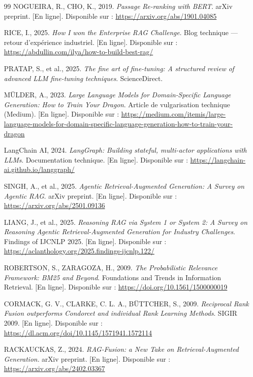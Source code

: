 \begin{thebibliography}{99}
NOGUEIRA, R., CHO, K., 2019. 
\textit{Passage Re-ranking with BERT}. 
arXiv preprint. 
[En ligne]. Disponible sur : \url{https://arxiv.org/abs/1901.04085}

RICE, I., 2025. 
\textit{How I won the Enterprise RAG Challenge}. 
Blog technique — retour d’expérience industriel. 
[En ligne]. Disponible sur : \url{https://abdullin.com/ilya/how-to-build-best-rag/}

PRATAP, S., et al., 2025. 
\textit{The fine art of fine-tuning: A structured review of advanced LLM fine-tuning techniques}. 
ScienceDirect.

MÜLDER, A., 2023. 
\textit{Large Language Models for Domain-Specific Language Generation: How to Train Your Dragon}. 
Article de vulgarisation technique (Medium). 
[En ligne]. Disponible sur : \url{https://medium.com/itemis/large-language-models-for-domain-specific-language-generation-how-to-train-your-dragon}


LangChain AI, 2024. 
\textit{LangGraph: Building stateful, multi-actor applications with LLMs}. 
Documentation technique. 
[En ligne]. Disponible sur : \url{https://langchain-ai.github.io/langgraph/}

SINGH, A., et al., 2025. 
\textit{Agentic Retrieval-Augmented Generation: A Survey on Agentic RAG}. 
arXiv preprint. 
[En ligne]. Disponible sur : \url{https://arxiv.org/abs/2501.09136}

LIANG, J., et al., 2025. 
\textit{Reasoning RAG via System 1 or System 2: A Survey on Reasoning Agentic Retrieval-Augmented Generation for Industry Challenges}. 
Findings of IJCNLP 2025. 
[En ligne]. Disponible sur : \url{https://aclanthology.org/2025.findings-ijcnlp.122/}

ROBERTSON, S., ZARAGOZA, H., 2009. 
\textit{The Probabilistic Relevance Framework: BM25 and Beyond}. 
Foundations and Trends in Information Retrieval. 
[En ligne]. Disponible sur : \url{https://doi.org/10.1561/1500000019}

CORMACK, G. V., CLARKE, C. L. A., BÜTTCHER, S., 2009. 
\textit{Reciprocal Rank Fusion outperforms Condorcet and individual Rank Learning Methods}. 
SIGIR 2009. 
[En ligne]. Disponible sur : \url{https://dl.acm.org/doi/10.1145/1571941.1572114}

RACKAUCKAS, Z., 2024. 
\textit{RAG-Fusion: a New Take on Retrieval-Augmented Generation.}
arXiv preprint. [En ligne]. Disponible sur : \url{https://arxiv.org/abs/2402.03367}


\end{thebibliography}
